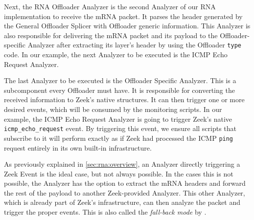 
Next, the RNA Offloader Analyzer is the second Analyzer of our RNA implementation to receive the mRNA packet. It parses the header generated by the General Offloader Splicer with Offloader generic information. This Analyzer is also responsible for delivering the mRNA packet and its payload to the Offloader-specific Analyzer after extracting its layer's header by using the Offloader \texttt{type} code. In our example, the next Analyzer to be executed is the ICMP Echo Request Analyzer.

The last Analyzer to be executed is the Offloader Specific Analyzer. This is a subcomponent every Offloader must have. It is responsible for converting the received information to Zeek's native structures. It can then trigger one or more desired events, which will be consumed by the monitoring scripts. In our example, the ICMP Echo Request Analyzer is going to trigger Zeek's native \texttt{icmp\_echo\_request} event. By triggering this event, we ensure all scripts that subscribe to it will perform exactly as if Zeek had processed the ICMP \texttt{ping} request entirely in its own built-in infrastructure.

As previously explained in \autoref{sec:rna:overview}, an Analyzer directly triggering a Zeek Event is the ideal case, but not always possible. In the cases this is not possible, the Analyzer has the option to extract the mRNA headers and forward the rest of the payload to another Zeek-provided Analyzer. This other Analyzer, which is already part of Zeek's infrastructure, can then analyze the packet and trigger the proper events. This is also called the \textit{fall-back mode} by .
